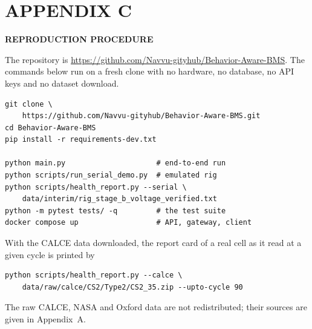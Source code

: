 \chapter*{APPENDIX C}

\begin{center}
\textbf{REPRODUCTION PROCEDURE}
\end{center}

The repository is \url{https://github.com/Navvu-gityhub/Behavior-Aware-BMS}. The commands below run on a fresh clone with no hardware, no database, no API keys and no dataset download.

\begin{small}
\begin{verbatim}
git clone \
    https://github.com/Navvu-gityhub/Behavior-Aware-BMS.git
cd Behavior-Aware-BMS
pip install -r requirements-dev.txt

python main.py                     # end-to-end run
python scripts/run_serial_demo.py  # emulated rig
python scripts/health_report.py --serial \
    data/interim/rig_stage_b_voltage_verified.txt
python -m pytest tests/ -q         # the test suite
docker compose up                  # API, gateway, client
\end{verbatim}
\end{small}

With the CALCE data downloaded, the report card of a real cell as it read at a given cycle is printed by

\begin{small}
\begin{verbatim}
python scripts/health_report.py --calce \
    data/raw/calce/CS2/Type2/CS2_35.zip --upto-cycle 90
\end{verbatim}
\end{small}

The raw CALCE, NASA and Oxford data are not redistributed; their sources are given in Appendix~A.
